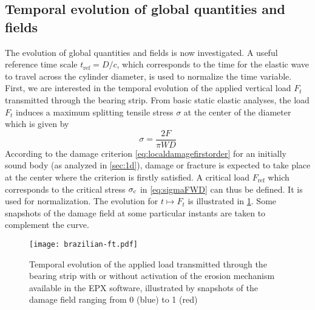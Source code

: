 \subsection{Temporal evolution of global quantities and fields}
The evolution of global quantities and fields is now investigated. A useful reference time scale $t_\mathrm{ref}=D/c$, which corresponds to the time for the elastic wave to travel across the cylinder diameter, is used to normalize the time variable. First, we are interested in the temporal evolution of the applied vertical load $F_t$ transmitted through the bearing strip. From basic static elastic analyses, the load $F_t$ induces a maximum splitting tensile stress $\sigma$ at the center of the diameter which is given by
\begin{equation} \label{eq:sigmaFWD}
\sigma=\frac{2F}{\pi WD}
\end{equation}
According to the damage criterion \eqref{eq:localdamagefirstorder} for an initially sound body (as analyzed in \cref{sec:1d}), damage or fracture is expected to take place at the center where the criterion is firstly satisfied. A critical load $F_\mathrm{ref}$ which corresponds to the critical stress $\sigma_{\mathrm{c}}$ in \eqref{eq:sigmaFWD} can thus be defined. It is used for normalization. The evolution for $t\mapsto F_t$ is illustrated in \cref{fig:brazilian_ft}. Some snapshots of the damage field at some particular instants are taken to complement the curve.
\begin{figure}[htbp]
\centering
\texttt{[image: brazilian-ft.pdf]}
\caption{Temporal evolution of the applied load transmitted through the bearing strip with or without activation of the erosion mechanism available in the EPX software, illustrated by snapshots of the damage field ranging from 0 (blue) to 1 (red)} \label{fig:brazilian_ft}
\end{figure}

